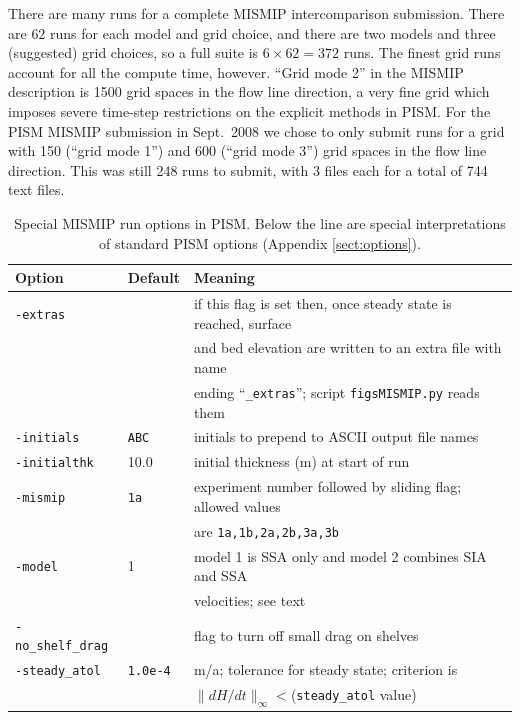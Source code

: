 \documentclass[11pt,final]{amsart}
\begin{document}
There are many runs for a complete MISMIP intercomparison submission.  There are $62$ runs for each model and grid choice, and there are two models and three (suggested) grid choices, so a full suite is $6 \times 62 = 372$ runs.  The finest grid runs account for all the compute time, however.  ``Grid mode 2'' in the MISMIP description is 1500 grid spaces in the flow line direction, a very fine grid which imposes severe time-step restrictions on the explicit methods in PISM.  For the PISM MISMIP submission in Sept.~2008 we chose to only submit runs for a grid with 150 (``grid mode 1'') and 600 (``grid mode 3'') grid spaces in the flow line direction.  This was still 248 runs to submit, with 3 files each for a total of 744 text files.
 
\begin{table}[ht]
\caption{Special MISMIP run options in PISM.  Below the line are special interpretations of standard PISM options (Appendix \ref{sect:options}).}\label{tab:MISMIPoptions}
\small
\begin{tabular}{@{}lll}\hline
\textbf{Option} & \textbf{Default} & \textbf{Meaning} \\ \hline
\verb|-extras| &  & if this flag is set then, once steady state is reached, surface \\
               &  & and bed elevation are written to an extra file with name \\
               &  & ending ``\verb|_extras|''; script \verb|figsMISMIP.py| reads them \\
\verb|-initials| & \verb|ABC| & initials to prepend to ASCII output file names \\
\verb|-initialthk| & 10.0 & initial thickness (m) at start of run \\
\verb|-mismip| & \verb|1a| & experiment number followed by sliding flag; allowed values \\
               &  & are \verb|1a,1b,2a,2b,3a,3b| \\
\verb|-model| & 1 & model 1 is SSA only and model 2 combines SIA and SSA  \\
              &   & velocities; see text \\
\verb|-no_shelf_drag| &  & flag to turn off small drag on shelves \\
\verb|-steady_atol| & \verb|1.0e-4| & m/a; tolerance for steady state; criterion is \\
                    & & $\|dH/dt\|_\infty <$(\verb|steady_atol| value) \\

\end{tabular}
\end{table}
\end{document}
